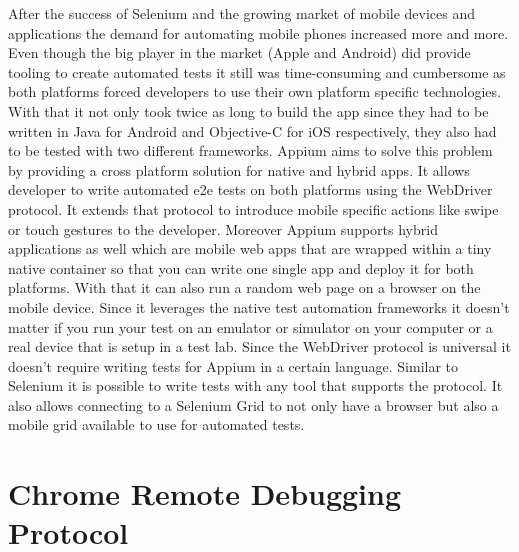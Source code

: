 After the success of Selenium and the growing market of mobile devices and applications the
demand for automating mobile phones increased more and more. Even though the big player in
the market (Apple and Android) did provide tooling to create automated tests it still was
time-consuming and cumbersome as both platforms forced developers to use their own platform
specific technologies. With that it not only took twice as long to build the app since they had
to be written in Java for Android and Objective-C for iOS respectively, they also had to be
tested with two different frameworks. Appium aims to solve this problem by providing a cross
platform solution for native and hybrid apps. It allows developer to write automated e2e tests
on both platforms using the WebDriver protocol. It extends that protocol to introduce mobile
specific actions like swipe or touch gestures to the developer. Moreover Appium supports hybrid
applications as well which are mobile web apps that are wrapped within a tiny native container
so that you can write one single app and deploy it for both platforms. With that it can also
run a random web page on a browser on the mobile device. Since it leverages the native test
automation frameworks it doesn't matter if you run your test on an emulator or simulator on your
computer or a real device that is setup in a test lab. Since the WebDriver protocol is universal
it doesn't require writing tests for Appium in a certain language. Similar to Selenium it is
possible to write tests with any tool that supports the protocol. It also allows connecting
to a Selenium Grid to not only have a browser but also a mobile grid available to use for
automated tests.

\section{Chrome Remote Debugging Protocol\label{sec:remotedebuggingprotocol}}

